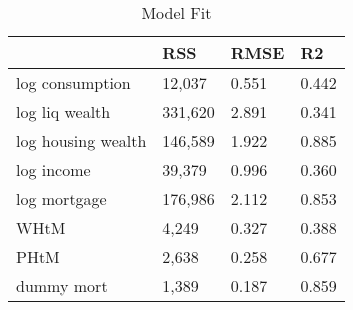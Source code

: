 \begin{table}[htbp]
\caption{\label{clabel} Model Fit}\centering\medskip
\begin{tabular}{llll} \hline \hline
 & RSS  & RMSE  & R2  \\  \hline 
log consumption &    12,037 &     0.551 &     0.442 \\  
log liq wealth &   331,620 &     2.891 &     0.341 \\  
log housing wealth &   146,589 &     1.922 &     0.885 \\  
log income &    39,379 &     0.996 &     0.360 \\  
log mortgage &   176,986 &     2.112 &     0.853 \\  
WHtM &     4,249 &     0.327 &     0.388 \\  
PHtM &     2,638 &     0.258 &     0.677 \\  
dummy mort &     1,389 &     0.187 &     0.859 \\  
\hline \hline \end{tabular}
\end{table}

